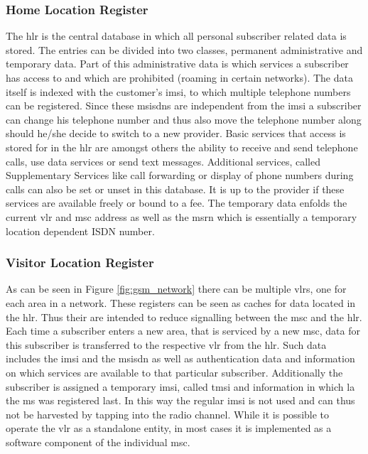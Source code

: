 \subsubsection{Home Location Register}
The \gls{hlr} is the central database in which all personal subscriber related data is stored.
The entries can be divided into two classes, permanent administrative and temporary data.
Part of this administrative data is which services a subscriber has access to and which are prohibited (\eg roaming in certain networks).
The data itself is indexed with the customer's \gls{imsi}, to which multiple telephone numbers can be registered.
Since these \glspl{msisdn} are independent from the \gls{imsi} a subscriber can change his telephone number and thus also move the telephone number along should he/she decide to switch to a new provider.
Basic services that access is stored for in the \gls{hlr} are amongst others the ability to receive and send telephone calls, use data services or send text messages.
Additional services, called Supplementary Services like call forwarding or display of phone numbers during calls can also be set or unset in this database.
It is up to the provider if these services are available freely or bound to a fee.
The temporary data enfolds the current \gls{vlr} and \gls{msc} address as well as the \gls{msrn} which is essentially a temporary location dependent ISDN number.

\subsubsection{Visitor Location Register}
As can be seen in Figure \ref{fig:gsm_network} there can be multiple \glspl{vlr}, one for each area in a network.
These registers can be seen as caches for data located in the \gls{hlr}.
Thus their are intended to reduce signalling between the \gls{msc} and the \gls{hlr}.
Each time a subscriber enters a new area, that is serviced by a new \gls{msc}, data for this subscriber is transferred to the respective \gls{vlr} from the \gls{hlr}.
Such data includes the \gls{imsi} and the \gls{msisdn} as well as authentication data and information on which services are available to that particular subscriber.
Additionally the subscriber is assigned a temporary \gls{imsi}, called \gls{tmsi} and information in which \gls{la} the \gls{ms} was registered last.
In this way the regular \gls{imsi} is not used and can thus not be harvested by tapping into the radio channel.
While it is possible to operate the \gls{vlr} as a standalone entity, in most cases it is implemented as a software component of the individual \gls{msc}.

